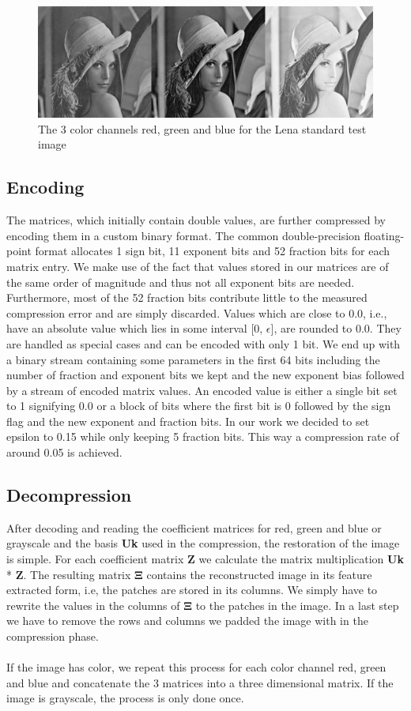 \documentclass[10pt,conference,compsocconf]{IEEEtran}
\begin{document}
\begin{figure}[h!]
\centering
  \includegraphics[scale=0.21]{figures/LenaCombined.jpg}
  \caption{The 3 color channels red, green and blue for the Lena standard test image}
  \label{fig:Lena}
\end{figure}
\subsection{Encoding}
The matrices, which initially contain double values, are further compressed by encoding them in a custom binary format. The common double-precision floating-point format allocates 1 sign bit, 11 exponent bits and 52 fraction bits for each matrix entry. We make use of the fact that values stored in our matrices are of the same order of magnitude and thus not all exponent bits are needed. Furthermore, most of the 52 fraction bits contribute little to the measured compression error and are simply discarded. Values which are close to 0.0, i.e., have an absolute value which lies in some interval [0, $\epsilon$], are rounded to 0.0. They are handled as special cases and can be encoded with only 1 bit. We end up with a binary stream containing some parameters in the first 64 bits including the number of fraction and exponent bits we kept and the new exponent bias followed by a stream of encoded matrix values. An encoded value is either a single bit set to 1 signifying 0.0 or a block of bits where the first bit is 0 followed by the sign flag and the new exponent and fraction bits. In our work we decided to set epsilon to 0.15 while only keeping 5 fraction bits. This way a compression rate of around 0.05 is achieved.
\subsection{Decompression}
After decoding and reading the coefficient matrices for red, green and blue or grayscale and the basis \textbf{Uk} used in the compression, the restoration of the image is simple. For each coefficient matrix \textbf{Z} we calculate the matrix multiplication \textbf{Uk} * \textbf{Z}. The resulting matrix $\boldsymbol{\Xi}$ contains the reconstructed image in its feature extracted form, i.e, the patches are stored in its columns. We simply have to rewrite the values in the columns of $\boldsymbol{\Xi}$ to the patches in the image. In a last step we have to remove the rows and columns we padded the image with in the compression phase.
\\
\\
If the image has color, we repeat this process for each color channel red, green and blue and concatenate the 3 matrices into a three dimensional matrix. If the image is grayscale, the process is only done once.
\end{document}
